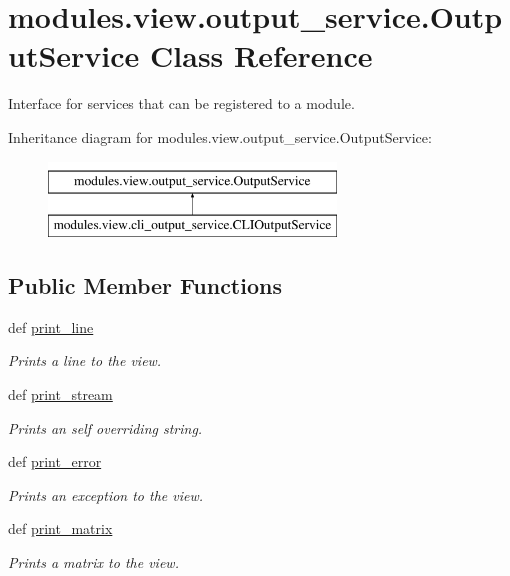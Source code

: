 \hypertarget{classmodules_1_1view_1_1output__service_1_1_output_service}{}\section{modules.\+view.\+output\+\_\+service.\+Output\+Service Class Reference}
\label{classmodules_1_1view_1_1output__service_1_1_output_service}


Interface for services that can be registered to a module.  


Inheritance diagram for modules.\+view.\+output\+\_\+service.\+Output\+Service\+:\begin{figure}[H]
\begin{center}
\leavevmode
\includegraphics[height=2.000000cm]{classmodules_1_1view_1_1output__service_1_1_output_service}
\end{center}
\end{figure}
\subsection*{Public Member Functions}
\begin{DoxyCompactItemize}
\item 
def \mbox{\hyperlink{classmodules_1_1view_1_1output__service_1_1_output_service_a8304983652bdd3c49eb620b7e20b4c20}{print\+\_\+line}}
\begin{DoxyCompactList}\small\item\em Prints a line to the view. \end{DoxyCompactList}\item 
def \mbox{\hyperlink{classmodules_1_1view_1_1output__service_1_1_output_service_aa5179629e76d57412ac243947a252331}{print\+\_\+stream}}
\begin{DoxyCompactList}\small\item\em Prints an self overriding string. \end{DoxyCompactList}\item 
def \mbox{\hyperlink{classmodules_1_1view_1_1output__service_1_1_output_service_a1cc2f7091e8bd0aac36200ebccf90e25}{print\+\_\+error}}
\begin{DoxyCompactList}\small\item\em Prints an exception to the view. \end{DoxyCompactList}\item 
def \mbox{\hyperlink{classmodules_1_1view_1_1output__service_1_1_output_service_ae50d47ab13cb38996d179c75bd2ee58e}{print\+\_\+matrix}}
\begin{DoxyCompactList}\small\item\em Prints a matrix to the view. \end{DoxyCompactList}\end{DoxyCompactItemize}


